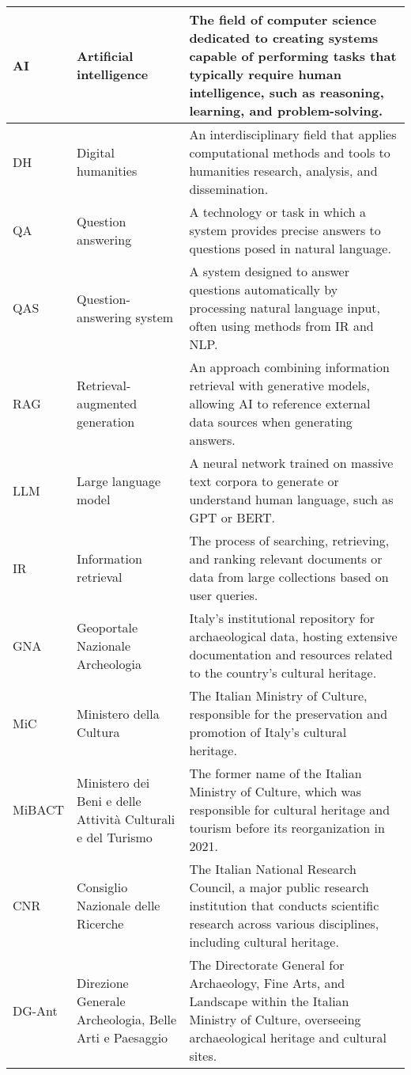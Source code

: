 \begin{tabularx}{\textwidth}{
  >{\raggedright\arraybackslash}p{2.5cm}
  >{\raggedright\arraybackslash}p{4cm}
  >{\noindent\justifying\arraybackslash}X
}
AI    & Artificial intelligence & The field of computer science dedicated to creating systems capable of performing tasks that typically require human intelligence, such as reasoning, learning, and problem-solving. \\
\cmidrule(lr){1-3}
DH    & Digital humanities & An interdisciplinary field that applies computational methods and tools to humanities research, analysis, and dissemination. \\
\cmidrule(lr){1-3}
QA    & Question answering & A technology or task in which a system provides precise answers to questions posed in natural language. \\
\cmidrule(lr){1-3}
QAS   & Question-answering system & A system designed to answer questions automatically by processing natural language input, often using methods from IR and NLP. \\
\cmidrule(lr){1-3}
RAG   & Retrieval-augmented generation & An approach combining information retrieval with generative models, allowing AI to reference external data sources when generating answers. \\
\cmidrule(lr){1-3}
LLM   & Large language model & A neural network trained on massive text corpora to generate or understand human language, such as GPT or BERT. \\
\cmidrule(lr){1-3}
IR    & Information retrieval & The process of searching, retrieving, and ranking relevant documents or data from large collections based on user queries. \\
\cmidrule(lr){1-3}
GNA   & Geoportale Nazionale Archeologia & Italy's institutional repository for archaeological data, hosting extensive documentation and resources related to the country's cultural heritage. \\
\cmidrule(lr){1-3}
MiC & Ministero della Cultura & The Italian Ministry of Culture, responsible for the preservation and promotion of Italy's cultural heritage. \\
\cmidrule(lr){1-3}
MiBACT & Ministero dei Beni e delle Attività Culturali e del Turismo & The former name of the Italian Ministry of Culture, which was responsible for cultural heritage and tourism before its reorganization in 2021. \\
\cmidrule(lr){1-3}
CNR & Consiglio Nazionale delle Ricerche & The Italian National Research Council, a major public research institution that conducts scientific research across various disciplines, including cultural heritage. \\
\cmidrule(lr){1-3}
DG-Ant & Direzione Generale Archeologia, Belle Arti e Paesaggio & The Directorate General for Archaeology, Fine Arts, and Landscape within the Italian Ministry of Culture, overseeing archaeological heritage and cultural sites. \\

\end{tabularx}
